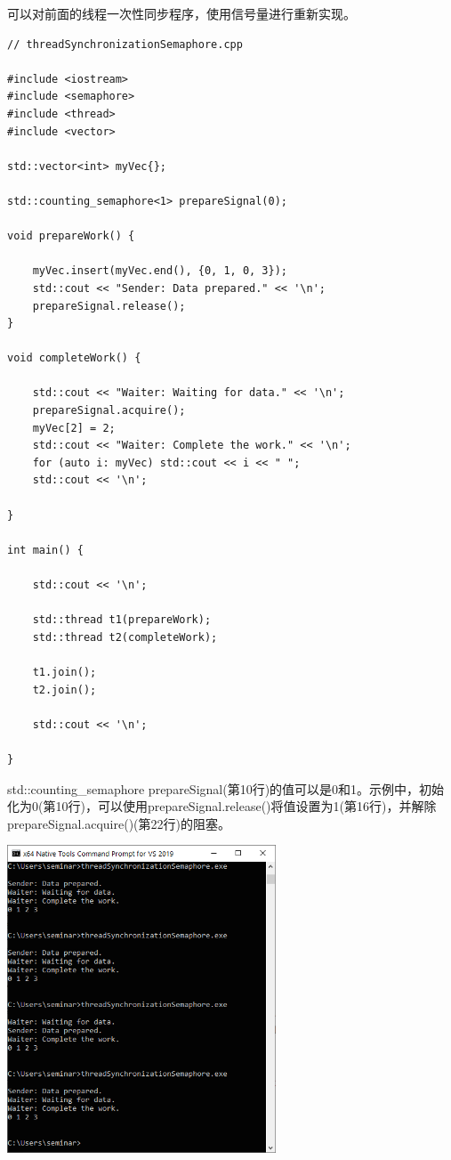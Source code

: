 可以对前面的线程一次性同步程序，使用信号量进行重新实现。

\begin{lstlisting}[style=styleCXX]
// threadSynchronizationSemaphore.cpp

#include <iostream>
#include <semaphore>
#include <thread>
#include <vector>

std::vector<int> myVec{};

std::counting_semaphore<1> prepareSignal(0);

void prepareWork() {

	myVec.insert(myVec.end(), {0, 1, 0, 3});
	std::cout << "Sender: Data prepared." << '\n';
	prepareSignal.release();
}

void completeWork() {

	std::cout << "Waiter: Waiting for data." << '\n';
	prepareSignal.acquire();
	myVec[2] = 2;
	std::cout << "Waiter: Complete the work." << '\n';
	for (auto i: myVec) std::cout << i << " ";
	std::cout << '\n';

}

int main() {

	std::cout << '\n';
	
	std::thread t1(prepareWork);
	std::thread t2(completeWork);
	
	t1.join();
	t2.join();
	
	std::cout << '\n';

}
\end{lstlisting}

std::counting\_semaphore prepareSignal(第10行)的值可以是0和1。示例中，初始化为0(第10行)，可以使用prepareSignal.release()将值设置为1(第16行)，并解除prepareSignal.acquire()(第22行)的阻塞。

\begin{center}
\includegraphics[width=0.6\textwidth]{content/3/chapter6/images/17.png}\\
\end{center}

